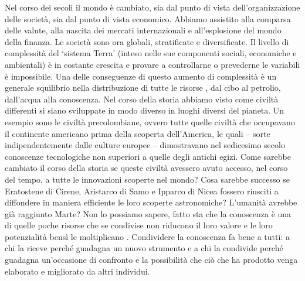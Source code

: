 Nel corso dei secoli il mondo è cambiato, sia dal punto di vista dell’organizzazione
delle società, sia dal punto di vista economico. Abbiamo assistito alla comparsa delle valute,
alla nascita dei mercati internazionali e all’esplosione del mondo della finanza. Le società
sono ora globali, stratificate e diversificate. Il livello di complessità del ‘sistema Terra’ (inteso
nelle sue componenti sociali, economiche e ambientali) è in costante crescita e provare a
controllarne o prevederne le variabili è impossibile. Una delle conseguenze di questo
aumento di complessità è un generale squilibrio nella distribuzione di tutte le risorse \parencite{balboni},
dal cibo al petrolio, dall’acqua alla conoscenza. Nel corso della storia abbiamo visto
come civiltà differenti si siano sviluppate in modo diverso in luoghi diversi del pianeta. Un
esempio sono le civiltà precolombiane, ovvero tutte quelle civiltà che occupavano il
continente americano prima della scoperta dell’America, le quali – sorte indipendentemente
dalle culture europee – dimostravano nel sedicesimo secolo conoscenze tecnologiche non
superiori a quelle degli antichi egizi. Come sarebbe cambiato il corso della storia se queste
civiltà avessero avuto accesso, nel corso del tempo, a tutte le innovazioni scoperte nel
mondo? Cosa sarebbe successo se Eratostene di Cirene, Aristarco di Samo e Ipparco di
Nicea fossero riusciti a diffondere in maniera efficiente le loro scoperte astronomiche?
L’umanità avrebbe già raggiunto Marte? Non lo possiamo sapere, fatto sta che la
conoscenza è una di quelle poche risorse che se condivise non riducono il loro valore e le
loro potenzialità bensì le moltiplicano \parencite{pulselli}. Condividere la conoscenza fa bene a
tutti: a chi la riceve perché guadagna un nuovo strumento e a chi la condivide perché
guadagna un'occasione di confronto e la possibilità che ciò che ha prodotto venga elaborato
e migliorato da altri individui.